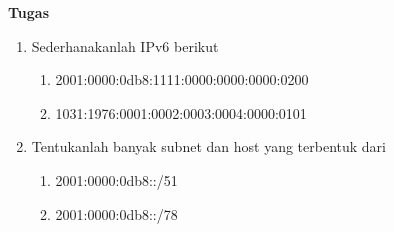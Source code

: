\documentclass{article}
\begin{document}
    \newpage
    \begin{flushleft}
        \textbf{Tugas}
        \newline

        \begin{enumerate}
            \item Sederhanakanlah IPv6 berikut
            \begin{enumerate}
                \item 2001:0000:0db8:1111:0000:0000:0000:0200
                \item 1031:1976:0001:0002:0003:0004:0000:0101
            \end{enumerate}
            \item Tentukanlah banyak subnet dan host yang terbentuk dari
            \begin{enumerate}
                \item 2001:0000:0db8::/51
                \item 2001:0000:0db8::/78
            \end{enumerate}
        \end{enumerate}
    \end{flushleft}
\end{document}
